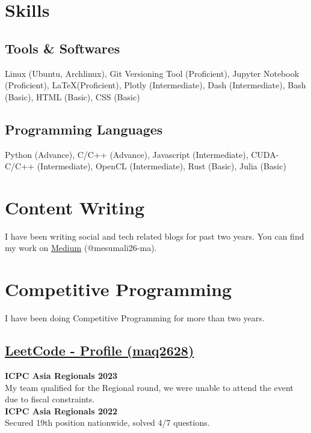 \documentclass[]{resume}
\begin{document}
\hfill
\begin{minipage}[t]{0.5\textwidth}


    \section{Skills}

    \subsection{Tools \& Softwares}
    Linux (Ubuntu, Archlinux),
    Git Versioning Tool (Proficient),
    Jupyter Notebook (Proficient),
    \LaTeX (Proficient),
    Plotly (Intermediate),
    Dash (Intermediate), Bash (Basic),
    HTML (Basic), CSS (Basic)\\

    \subsection{Programming Languages}
	Python (Advance), C/C++ (Advance), Javascript (Intermediate), CUDA-C/C++ (Intermediate), OpenCL (Intermediate), Rust (Basic), Julia (Basic)


    \section{Content Writing}
    I have been writing social and tech related blogs for past two years. You can find my work on \href{https://medium.com/@mesumali26-ma}{Medium} (@mesumali26-ma).

    \section{Competitive Programming}
    I have been doing Competitive Programming for more than two years.\\
    \subsection{\href{https://leetcode.com/maq2628/}{\textbf{LeetCode - Profile (maq2628)}}}
    \textbf{ICPC Asia Regionals 2023}\\
    My team qualified for the Regional round, we were unable to attend the event due to fiscal constraints.\\
    \textbf{ICPC Asia Regionals 2022}\\
    Secured 19th position nationwide, solved 4/7 questions.


\end{minipage}
\end{document}
